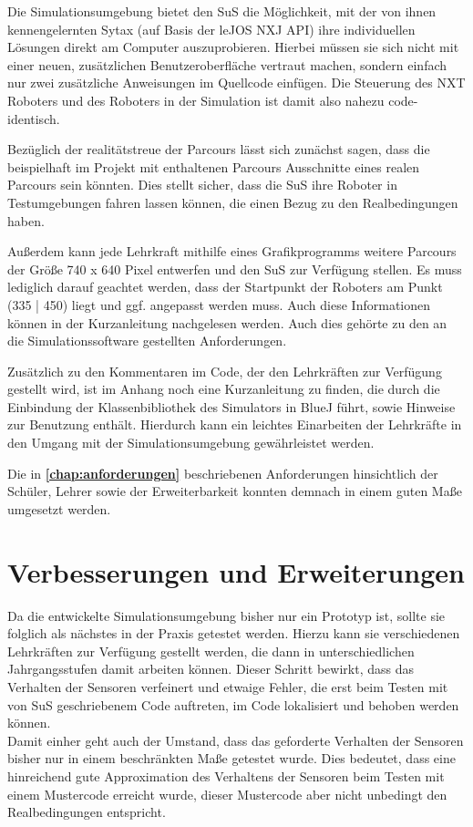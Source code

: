 \documentclass[paper=a4, DIV=14, BCOR=15mm, twoside=on, onecolumn=on, open = right, titlepage =on, parskip =half, headsepline = on, footsepline = on, chapterprefix = on, appendixprefix = off, fontsize = 12pt, numbers = noenddot, abstract = on]{scrbook}
\begin{document}
Die Simulationsumgebung bietet den SuS die Möglichkeit, mit der von ihnen kennengelernten Sytax (auf Basis der leJOS NXJ API) ihre individuellen Lösungen direkt am Computer auszuprobieren. Hierbei müssen sie sich nicht mit einer neuen, zusätzlichen Benutzeroberfläche vertraut machen, sondern einfach nur zwei zusätzliche Anweisungen im Quellcode einfügen. Die Steuerung des NXT Roboters und des Roboters in der Simulation ist damit also nahezu code-identisch.

Bezüglich der realitätstreue der Parcours lässt sich zunächst sagen, dass die beispielhaft im Projekt mit enthaltenen Parcours Ausschnitte eines realen Parcours sein könnten. Dies stellt sicher, dass die SuS ihre Roboter in Testumgebungen fahren lassen können, die einen Bezug zu den Realbedingungen haben.

Außerdem kann jede Lehrkraft mithilfe eines Grafikprogramms weitere Parcours der Größe 740 x 640 Pixel entwerfen und den SuS zur Verfügung stellen. Es muss lediglich darauf geachtet werden, dass der Startpunkt der Roboters am Punkt (335 | 450) liegt und ggf. angepasst werden muss. Auch diese Informationen können in der Kurzanleitung nachgelesen werden. Auch dies gehörte zu den an die Simulationssoftware gestellten Anforderungen.

Zusätzlich zu den Kommentaren im Code, der den Lehrkräften zur Verfügung gestellt wird, ist im Anhang noch eine Kurzanleitung zu finden, die durch die Einbindung der Klassenbibliothek des Simulators in BlueJ führt, sowie Hinweise zur Benutzung enthält. Hierdurch kann ein leichtes Einarbeiten der Lehrkräfte in den Umgang mit der Simulationsumgebung gewährleistet werden. 

Die in \textbf{\ref{chap:anforderungen}} beschriebenen Anforderungen hinsichtlich der Schüler, Lehrer sowie der Erweiterbarkeit konnten demnach in einem guten Maße umgesetzt werden.

\section{Verbesserungen und Erweiterungen}

Da die entwickelte Simulationsumgebung bisher nur ein Prototyp ist, sollte sie folglich als nächstes in der Praxis getestet werden. Hierzu kann sie verschiedenen Lehrkräften zur Verfügung gestellt werden, die dann in unterschiedlichen Jahrgangsstufen damit arbeiten können. Dieser Schritt bewirkt, dass das Verhalten der Sensoren verfeinert und etwaige Fehler, die erst beim Testen mit von SuS geschriebenem Code auftreten, im Code lokalisiert und behoben werden können.\\
Damit einher geht auch der Umstand, dass das geforderte Verhalten der Sensoren bisher nur in einem beschränkten Maße getestet wurde. Dies bedeutet, dass eine hinreichend gute Approximation des Verhaltens der Sensoren beim Testen mit einem Mustercode erreicht wurde, dieser Mustercode aber nicht unbedingt den Realbedingungen entspricht. 
\end{document}
